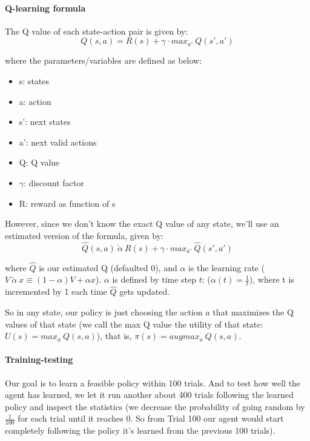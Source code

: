\documentclass{article}
\providecommand{\tightlist}{%
      \setlength{\itemsep}{0pt}\setlength{\parskip}{0pt}}
\begin{document}
\paragraph{Q-learning formula}\label{q-learning-formula}

The Q value of each state-action pair is given by: \[
Q(s, a) = R(s) + \gamma \cdot max_{a'}\ Q(s', a')
\]

where the parameters/variables are defined as below:

\begin{itemize}
\tightlist
\item
  s: states
\item
  a: action
\item
  s': next states
\item
  a': next valid actions
\item
  Q: Q value
\item
  \(\gamma\): discount factor
\item
  R: reward as function of s
\end{itemize}

However, since we don't know the exact Q value of any state, we'll use
an estimated version of the formula, given by: \[
\hat{Q}(s, a)\  \overleftarrow{\alpha}\  R(s) + \gamma \cdot max_{a'}\ \hat{Q}(s', a')
\]

where \(\hat{Q}\) is our estimated Q (defaulted 0), and \(\alpha\) is
the learning rate
(\(V\ \overleftarrow{\alpha}\ x \equiv (1 - \alpha)V + \alpha x\)).
\(\alpha\) is defined by time step \(t\): (\(\alpha(t) = \frac{1}{t}\)),
where t is incremented by 1 each time \(\hat{Q}\) gets updated.

So in any state, our policy is just choosing the action \(a\) that
maximizes the Q values of that state (we call the max Q value the
utility of that state: \(U(s) = max_{a}\ Q(s, a)\)), that is,
\(\pi(s) = augmax_{a}\ Q(s, a)\).

\paragraph{Training-testing}\label{training-testing}

Our goal is to learn a feasible policy within 100 trials. And to test
how well the agent has learned, we let it run another about 400 trials
following the learned policy and inspect the statistics (we decrease the
probability of going random by \(\frac{1}{100}\) for each trial until it
reaches 0. So from Trial 100 our agent would start completely following
the policy it's learned from the previous 100 trials).
\end{document}
